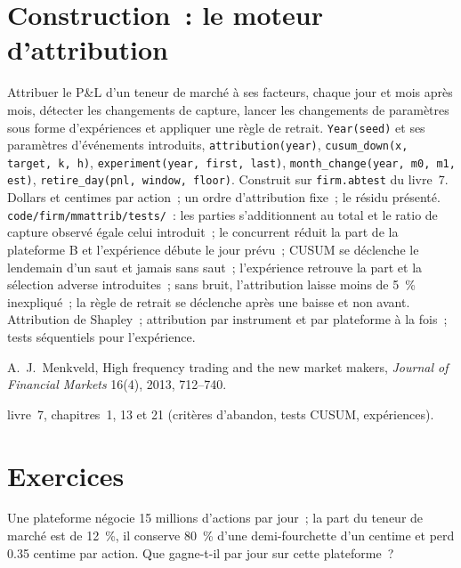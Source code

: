 \section{Construction~: le moteur d'attribution}\label{bld:hf:pnl-analytics-and-the-strategy-lifecycle:mmattrib}

\begin{build}
 Attribuer le P\&L d'un teneur de marché à ses facteurs, chaque jour et mois après mois, détecter les changements de capture, lancer les changements de paramètres
sous forme d'expériences et appliquer une règle de retrait.
 \texttt{Year(seed)} et ses paramètres d'événements introduits, \texttt{attribution(year)}, \texttt{cusum\_down(x, target, k, h)},
\texttt{experiment(year, first, last)}, \texttt{month\_change(year, m0, m1, est)}, \texttt{retire\_day(pnl, window, floor)}. Construit sur \texttt{firm.abtest} du livre~7.
 Dollars et centimes par action~; un ordre d'attribution fixe~; le résidu présenté.
 \texttt{code/firm/mmattrib/tests/}~: les parties s'additionnent au total et le ratio de capture observé égale celui introduit~; le
concurrent réduit la part de la plateforme B et l'expérience débute le jour prévu~; CUSUM se déclenche le lendemain d'un saut et jamais sans saut~; l'expérience
retrouve la part et la sélection adverse introduites~; sans bruit, l'attribution laisse moins de 5~\% inexpliqué~; la règle de retrait se déclenche après une baisse et
non avant.
 Attribution de Shapley~; attribution par instrument et par plateforme à la fois~; tests séquentiels pour l'expérience.
\end{build}

\begin{omsources}
\item A.~J.~Menkveld, High frequency trading and the new market makers, \emph{Journal of Financial Markets} 16(4), 2013, 712--740.
\item livre~7, chapitres~1, 13 et 21 (critères d'abandon, tests CUSUM, expériences).
\end{omsources}

\section{Exercices}

\begin{exercise}[$\star$]\label{exo:hf:pnl-analytics-and-the-strategy-lifecycle:1}
Une plateforme négocie 15 millions d'actions par jour~; la part du teneur de marché est de 12~\%, il conserve 80~\% d'une demi-fourchette d'un centime et perd 0.35 centime par action. Que
gagne-t-il par jour sur cette plateforme~?
\end{exercise}

